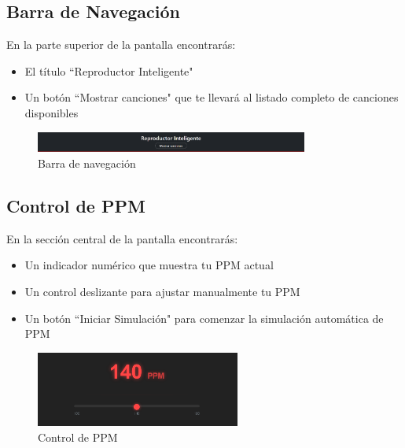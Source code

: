 \documentclass[a4paper,12pt]{article}
\begin{document}
\subsection{Barra de Navegación}
En la parte superior de la pantalla encontrarás:
\begin{itemize}
    \item El título ``Reproductor Inteligente"
    \item Un botón ``Mostrar canciones" que te llevará al listado completo de canciones disponibles
\end{itemize}

 \begin{figure}[h]
     \centering
     \includegraphics[width=0.8\textwidth]{imagenes/barra_navegacion.png}
     \caption{Barra de navegación}
 \end{figure}

\subsection{Control de PPM}
En la sección central de la pantalla encontrarás:
\begin{itemize}
    \item Un indicador numérico que muestra tu PPM actual
    \item Un control deslizante para ajustar manualmente tu PPM
    \item Un botón ``Iniciar Simulación" para comenzar la simulación automática de PPM
\end{itemize}

 \begin{figure}[h]
     \centering
     \includegraphics[width=0.6\textwidth]{imagenes/control_ppm.png}
     \caption{Control de PPM}
 \end{figure}

\end{document}
